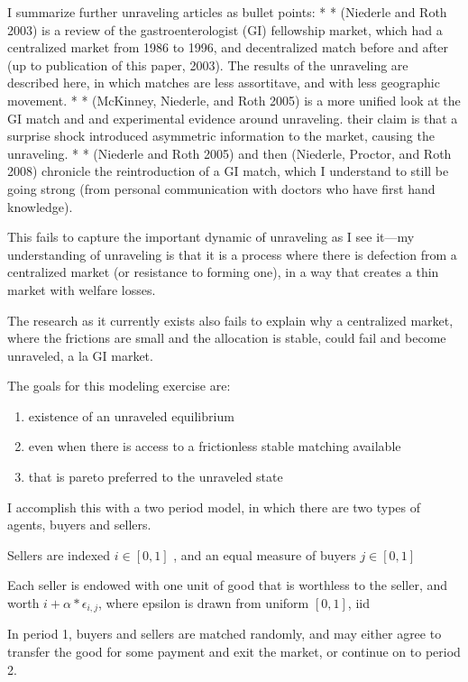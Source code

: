\documentclass[AER]{AEA}
\begin{document}
I summarize further unraveling articles as bullet points:
* * (Niederle and Roth 2003) is a review of the gastroenterologist (GI) fellowship market, which had a centralized market from 1986 to 1996, and decentralized match before and after (up to publication of this paper, 2003).  The results of the unraveling are described here, in which matches are less assortitave, and with less geographic movement.
* * (McKinney, Niederle, and Roth 2005) is a more unified look at the GI match and and experimental evidence around unraveling.  their claim is that a surprise shock introduced asymmetric information to the market, causing the unraveling.  
* * (Niederle and Roth 2005) and then (Niederle, Proctor, and Roth 2008) chronicle the reintroduction of a GI match, which I understand to still be going strong (from personal communication with doctors who have first hand knowledge).



This fails to capture the important dynamic of unraveling as I see it—my understanding of unraveling is that it is a process where there is defection from a centralized market (or resistance to forming one), in a way that creates a thin market with welfare losses.  

The research as it currently exists also fails to explain why a centralized market, where the frictions are small and the allocation is stable, could fail and become unraveled, a la GI market.


The goals for this modeling exercise are:
\begin{enumerate}
	\item  existence of an unraveled equilibrium
	\item  even when there is access to a frictionless stable matching available
	\item  that is pareto preferred to the unraveled state
\end{enumerate}


I accomplish this with a two period model, in which there are two types of agents, buyers and sellers.

Sellers are indexed $i \in [0,1]$ , and an equal measure of buyers $j \in [0,1]$

Each seller is endowed with one unit of good that is worthless to the seller, and worth $i+\alpha * \epsilon_{i,j}$, where epsilon is drawn from uniform $[0,1]$, iid

In period 1, buyers and sellers are matched randomly, and may either agree to transfer the good for some payment and exit the market, or continue on to period 2.
\end{document}
